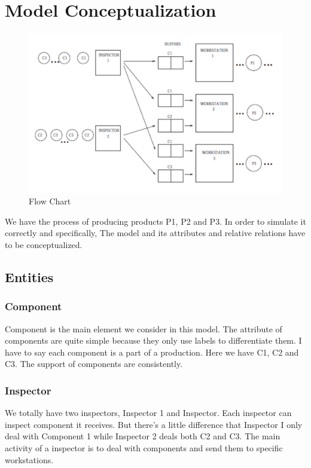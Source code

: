 \documentclass{article}
\begin{document}
\section{Model Conceptualization}
\begin{figure}[htbp]
\begin{center}
\includegraphics[width=5in]{Process.png}
\caption{Flow Chart}
\label{default}
\end{center}
\end{figure}

We have the process of producing products P1, P2 and P3. In order to simulate it correctly and specifically, The model and its attributes and relative relations have to be conceptualized. 

\subsection{Entities}
\subsubsection{Component}

Component is the main element we consider in this model. The attribute of components are quite simple because they only use labels to differentiate them. I have to say each component is a part of a production. Here we have C1, C2 and C3. The support of components are consistently.

\subsubsection{Inspector}

We totally have two inspectors, Inspector 1 and Inspector. Each inspector can inspect component it receives. But there's a little difference that Inspector I only deal with Component 1 while Inspector 2 deals both C2 and C3. The main activity of a inspector is to deal with components and send them to specific workstations.
\end{document}
